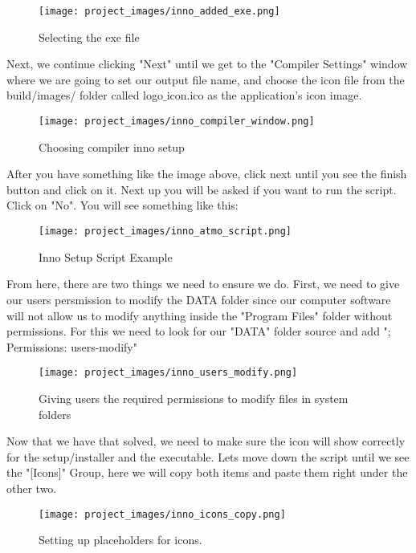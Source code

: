 \begin{figure}[H]
\centering
\texttt{[image: project\_images/inno\_added\_exe.png]}
 \caption{Selecting the exe file}
 \label{fig:inno added exe}
\end{figure}

	Next, we continue clicking "Next" until we get to the "Compiler Settings" window where we are going to set our output file name, and choose the icon file from the build/images/ folder called logo$\_$icon.ico as the application's icon image.

\begin{figure}[H]
\centering
\texttt{[image: project\_images/inno\_compiler\_window.png]}
 \caption{Choosing compiler inno setup}
 \label{fig:inno compiler window}
\end{figure}

	After you have something like the image above, click next until you see the finish button and click on it. Next up you will be asked if you want to run the script. Click on "No".
	You will see something like this:

\begin{figure}[H]
\centering
\texttt{[image: project\_images/inno\_atmo\_script.png]}
 \caption{Inno Setup Script Example}
 \label{fig:inno atmo script}
\end{figure}

	From here, there are two things we need to ensure we do. First, we need to give our users persmission to modify the DATA folder since our computer software will not allow us to modify anything inside the "Program Files" folder without permissions. For this we need to look for our "DATA" folder source and add "; Permissions: users-modify"

\begin{figure}[H]
\centering
\texttt{[image: project\_images/inno\_users\_modify.png]}
 \caption{Giving users the required permissions to modify files in system folders}
 \label{fig:inno users modify}
\end{figure}

	Now that we have that solved, we need to make sure the icon will show correctly for the setup/installer and the executable. Lets move down the script until we see the "[Icons]" Group, here we will copy both items and paste them right under the other two.

\begin{figure}[H]
\centering
\texttt{[image: project\_images/inno\_icons\_copy.png]}
 \caption{Setting up placeholders for icons.}
 \label{fig:inno icons copy}
\end{figure}

